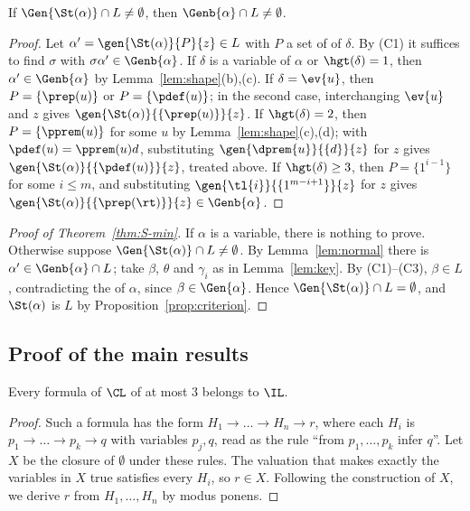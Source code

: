 \begin{lemma}\label{lem:normal}
If $\Gen{\St(\alpha)}\cap L\ne\emptyset$, then $\Genb{\alpha}\cap L\ne\emptyset$.
\end{lemma}
\begin{proof}
Let $\alpha'=\gen{\St(\alpha)}{P}{z}\in L$ with $P$ a set of
 of $\delta$. By (C1) it suffices to find $\sigma$ with
$\sigma\alpha'\in\Genb{\alpha}$. If $\delta$ is a variable of $\alpha$ or
$\hgt(\delta)=1$, then $\alpha'\in\Genb{\alpha}$ by
Lemma~\ref{lem:shape}(b),(c). If $\delta=\ev{u}$, then $P=\{\prep(u)\}$ or
$P=\{\pdef(u)\}$; in the second case, interchanging $\ev{u}$ and $z$ gives
$\gen{\St(\alpha)}{\{\prep(u)\}}{z}$. If $\hgt(\delta)=2$, then
$P=\{\pprem(u)\}$ for some $u$ by Lemma~\ref{lem:shape}(c),(d); with
$\pdef(u)=\pprem(u)d$, substituting $\gen{\dprem{u}}{\{d\}}{z}$ for $z$
gives $\gen{\St(\alpha)}{\{\pdef(u)\}}{z}$, treated above. If
$\hgt(\delta)\ge3$, then $P=\{1^{i-1}\}$ for some $i\le m$, and substituting
$\gen{\tl{i}}{\{1^{m-i+1}\}}{z}$ for $z$ gives
$\gen{\St(\alpha)}{\{\prep(\rt)\}}{z}\in\Genb{\alpha}$.
\end{proof}

\begin{proof}[Proof of Theorem~\ref{thm:S-min}]
If $\alpha$ is a variable, there is nothing to prove. Otherwise suppose
$\Gen{\St(\alpha)}\cap L\ne\emptyset$. By Lemma~\ref{lem:normal} there is
$\alpha'\in\Genb{\alpha}\cap L$; take $\beta$, $\theta$ and $\gamma_i$ as
in Lemma~\ref{lem:key}. By (C1)--(C3), $\beta\in L$, contradicting the
 of $\alpha$, since $\beta\in\Gen{\alpha}$. Hence
$\Gen{\St(\alpha)}\cap L=\emptyset$, and $\St(\alpha)$ is 
$L$ by Proposition~\ref{prop:criterion}.
\end{proof}

\subsection{Proof of the main results}

\begin{proposition}\label{prop:order3}
Every formula of $\CL$ of  at most $3$ belongs to $\IL$.
\end{proposition}
\begin{proof}
Such a formula has the form $H_1\to\dots\to H_n\to r$, where each $H_i$
is $p_1\to\dots\to p_k\to q$ with variables $p_j,q$, read as the rule
``from $p_1,\dots,p_k$ infer $q$''. Let $X$ be the closure of $\emptyset$
under these rules. The valuation that makes exactly the variables in $X$
true satisfies every $H_i$, so $r\in X$. Following the construction of $X$,
we derive $r$ from $H_1,\dots,H_n$ by modus ponens.
\end{proof}

